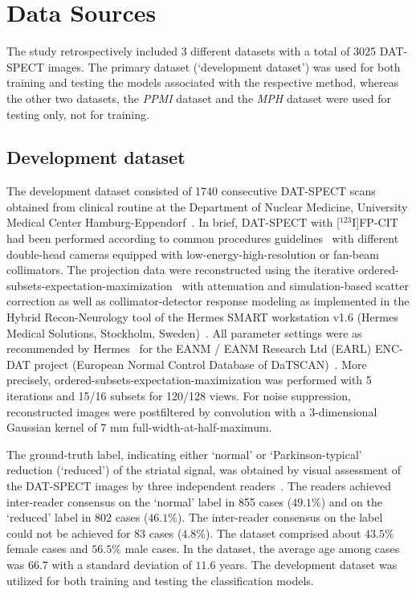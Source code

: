 \section{Data Sources}
\label{sec:data}

The study retrospectively included 3 different datasets with a total of 3025 DAT-SPECT images.
The primary dataset (`development dataset') was used for both training and testing the models associated with the respective method, 
whereas the other two datasets, the \textit{PPMI} dataset and the \textit{MPH} dataset were used for testing only, not for training.

\subsection{Development dataset}
\label{subsec:spect_dataset}

The development dataset consisted of 1740 consecutive DAT-SPECT scans obtained from clinical routine at 
the Department of Nuclear Medicine, University Medical Center Hamburg-Eppendorf~\citep{Schiebler2023}.
In brief, DAT-SPECT with [$^{123}$I]FP-CIT had been performed according to common procedures guidelines~\citep{Darcourt2010-ar, Djang2012-ow} 
with different double-head cameras equipped with low-energy-high-resolution or fan-beam collimators. 
The projection data were reconstructed using the iterative ordered-subsets-expectation-maximization~\citep{Hudson1994} 
with attenuation and simulation-based scatter correction 
as well as collimator-detector response modeling as implemented in the Hybrid Recon-Neurology tool 
of the Hermes SMART workstation v1.6 (Hermes Medical Solutions, Stockholm, Sweden)~\citep{Diemling2021-mg, Sohlberg2012-ep, HybridRecon, Kangasmaa2016-aw}.
All parameter settings were as recommended by Hermes~\citep{Diemling2021-mg} for the EANM / EANM Research Ltd (EARL) ENC-DAT project (European Normal Control Database of DaTSCAN)~\citep{Tossici-Bolt2011-cx, Dickson2010-fm, Varrone2013-it, Tossici-Bolt2017-xj, Dickson2012-hk}.
More precisely, ordered-subsets-expectation-maximization was performed with 5 iterations and 15/16 subsets for 120/128 views. 
For noise suppression, reconstructed images were postfiltered by convolution with a 3-dimensional Gaussian kernel of 7 mm full-width-at-half-maximum. 

The ground-truth label, indicating either `normal' or `Parkinson-typical' reduction (`reduced') of the striatal signal, 
was obtained by visual assessment of the DAT-SPECT images by three independent readers~\citep{Schiebler2023}. 
The readers achieved inter-reader consensus on the `normal' label in 855 cases ($49.1\%$)
and on the `reduced' label in 802 cases ($46.1\%$).
The inter-reader consensus on the label could not be achieved for 83 cases ($4.8\%$).
The dataset comprised about $43.5\%$ female cases and $56.5\%$ male cases.
In the dataset, the average age among cases was $66.7$ with a standard deviation of $11.6$ years.
The development dataset was utilized for both training and testing the classification models. 

